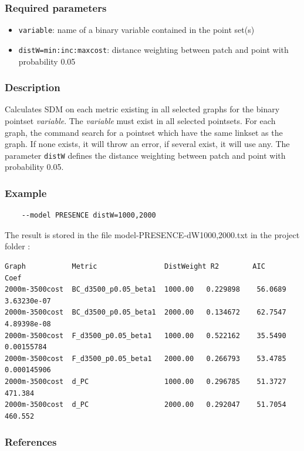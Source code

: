 \documentclass[a4paper,10pt]{report}
\begin{document}
\subsubsection{Required parameters}
\begin{itemize}
	\item \verb|variable|: name of a binary variable contained in the point set(s)
	\item \verb|distW=min:inc:maxcost|: distance weighting between patch and point with probability 0.05	
\end{itemize}

\subsubsection{Description}
Calculates SDM on each metric existing in all selected graphs for the binary pointset \textit{variable}.
The \textit{variable} must exist in all selected pointsets.
For each graph, the command search for a pointset which have the same linkset as the graph. If none exists, it will throw an error, if several exist, it will use any.
The parameter \verb|distW| defines the distance weighting between patch and point with probability 0.05.

\subsubsection{Example}
\begin{Verbatim}
	--model PRESENCE distW=1000,2000
\end{Verbatim}
The result is stored in the file model-PRESENCE-dW1000,2000.txt in the project folder :
\begin{Verbatim}[tabsize=3]
Graph           Metric                DistWeight R2        AIC       Coef
2000m-3500cost  BC_d3500_p0.05_beta1  1000.00	0.229898	56.0689	3.63230e-07
2000m-3500cost  BC_d3500_p0.05_beta1  2000.00	0.134672	62.7547	4.89398e-08
2000m-3500cost  F_d3500_p0.05_beta1   1000.00	0.522162	35.5490	0.00155784
2000m-3500cost  F_d3500_p0.05_beta1   2000.00	0.266793	53.4785	0.000145906
2000m-3500cost  d_PC                  1000.00	0.296785	51.3727	471.384
2000m-3500cost  d_PC                  2000.00	0.292047	51.7054	460.552
\end{Verbatim}

\subsubsection{References}
\cite{2012_SDM, 2012_graphab_EMS, 2013_SDM, 2013_SDM_rainette}
\end{document}
